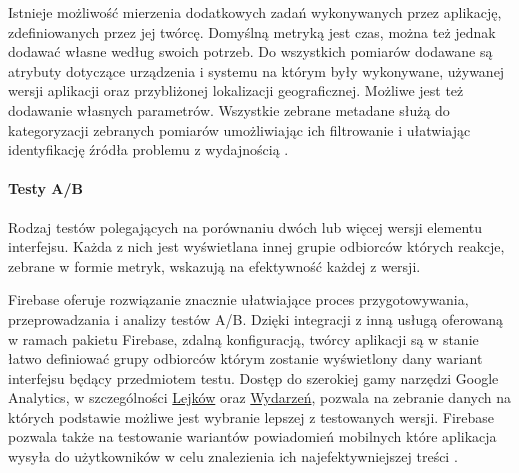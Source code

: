 Istnieje możliwość mierzenia dodatkowych zadań wykonywanych przez aplikację, zdefiniowanych przez jej twórcę. Domyślną metryką jest czas, można też jednak dodawać własne według swoich potrzeb. Do wszystkich pomiarów dodawane są atrybuty dotyczące urządzenia i systemu na którym były wykonywane, używanej wersji aplikacji oraz przybliżonej lokalizacji geograficznej. Możliwe jest też dodawanie własnych parametrów. Wszystkie zebrane metadane służą do kategoryzacji zebranych pomiarów umożliwiając ich  filtrowanie i ułatwiając identyfikację źródła problemu z wydajnością \cite{Fb_Pref_Monitor}.

\paragraph{Testy A/B}
Rodzaj testów polegających na porównaniu dwóch lub więcej wersji elementu interfejsu. Każda z nich jest wyświetlana innej grupie odbiorców których reakcje, zebrane w formie metryk, wskazują na efektywność każdej z wersji. 

Firebase oferuje rozwiązanie znacznie ułatwiające proces przygotowywania, przeprowadzania i analizy testów A/B. Dzięki integracji z inną usługą oferowaną w ramach pakietu Firebase, zdalną konfiguracją, twórcy aplikacji są w stanie łatwo definiować grupy odbiorców którym zostanie wyświetlony dany wariant interfejsu będący przedmiotem testu. Dostęp do szerokiej gamy narzędzi Google Analytics, w szczególności \hyperref[par:ga-funnels]{Lejków} oraz  \hyperref[par:ga-events]{Wydarzeń}, pozwala na zebranie danych na których podstawie możliwe jest wybranie lepszej z testowanych wersji. Firebase pozwala także na testowanie wariantów powiadomień mobilnych które aplikacja wysyła do użytkowników w celu znalezienia ich najefektywniejszej treści \cite{Fb_AB_Testing}.
